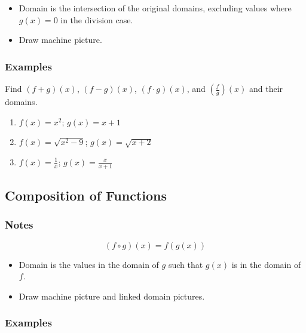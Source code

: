 \documentclass{exam}
\begin{document}
\begin{itemize}
  \item Domain is the intersection of the original domains, excluding values where $g(x) = 0$ in the division case.
  \item Draw machine picture.
\end{itemize}

\subsubsection{Examples}

Find $(f + g)(x)$, $(f - g)(x)$, $(f \cdot g)(x)$, and $\left( \frac{f}{g} \right)(x)$ and their domains.

\begin{enumerate}
  \item $f(x) = x^2$; $g(x) = x + 1$

  \item $f(x) = \sqrt{x^2 - 9}$; $g(x) = \sqrt{x + 2}$

  \item $f(x) = \frac{1}{x}$; $g(x) = \frac{x}{x + 1}$

\end{enumerate}

\subsection{Composition of Functions}
\subsubsection{Notes}

\[
  (f \circ g)(x) = f(g(x))
\]

\begin{itemize}
  \item Domain is the values in the domain of $g$ such that $g(x)$ is in the domain of $f$.

  \item Draw machine picture and linked domain pictures.

\end{itemize}

\subsubsection{Examples}
\end{document}
